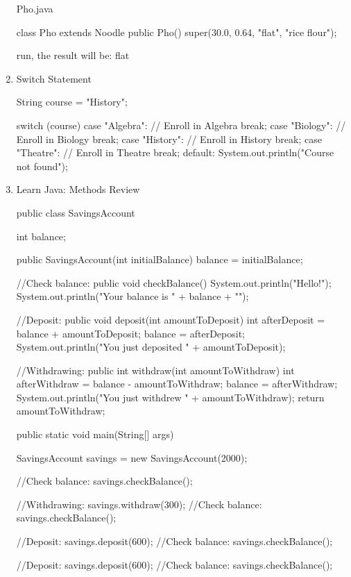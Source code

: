 \documentclass[a4paper,12pt]{article}
\begin{document}
\begin{enumerate}
Pho.java
\begin{javacode}
class Pho extends Noodle {
  public Pho() {
    super(30.0, 0.64, "flat", "rice flour");
  }
}
\end{javacode}
run, the result will be: flat

\item Switch Statement
\begin{javacode}
String course = "History";

switch (course) {
  case "Algebra": 
    // Enroll in Algebra
    break; 
  case "Biology": 
    // Enroll in Biology
    break;
  case "History": 
    // Enroll in History
    break;
  case "Theatre":
    // Enroll in Theatre
    break;
  default:
    System.out.println("Course not found");
}
\end{javacode}

\item Learn Java: Methods Review
\begin{javacode}
public class SavingsAccount {

  int balance;

  public SavingsAccount(int initialBalance) {
    balance = initialBalance;
  }

  //Check balance:
  public void checkBalance() {
    System.out.println("Hello!");
    System.out.println("Your balance is " + balance + "\n");
  }

  //Deposit:
  public void deposit(int amountToDeposit) {
    int afterDeposit = balance + amountToDeposit;
    balance = afterDeposit;
    System.out.println("You just deposited " + amountToDeposit);
  }

  //Withdrawing:
  public int withdraw(int amountToWithdraw) {
    int afterWithdraw = balance - amountToWithdraw;
    balance = afterWithdraw;
    System.out.println("You just withdrew " + amountToWithdraw);
    return amountToWithdraw;
  }

  public static void main(String[] args) {
    SavingsAccount savings = new SavingsAccount(2000);

    //Check balance:
    savings.checkBalance();

    //Withdrawing:
    savings.withdraw(300);
    //Check balance:
    savings.checkBalance();

    //Deposit:
    savings.deposit(600);
    //Check balance:
    savings.checkBalance();

    //Deposit:
    savings.deposit(600);
    //Check balance:
    savings.checkBalance();
  }
}
\end{javacode}


\end{enumerate}
\end{document}
